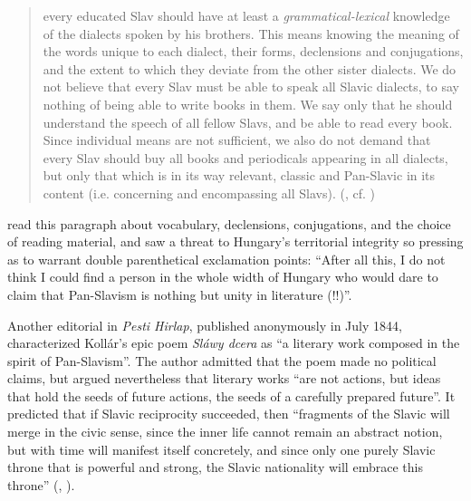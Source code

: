 \begin{quote}
    every educated Slav should have at least a \textit{grammatical-lexical} knowledge of the dialects spoken by his brothers. This means knowing the meaning of the words unique to each dialect, their forms, declensions and conjugations, and the extent to which they deviate from the other sister dialects. We do not believe that every Slav must be able to speak all Slavic dialects, to say nothing of being able to write books in them. We say only that he should understand the speech of all fellow Slavs, and be able to read every book. Since individual means are not sufficient, we also do not demand that every Slav should buy all books and periodicals appearing in all dialects, but only that which is in its way relevant, classic and Pan-Slavic in its content (i.e. concerning and encompassing all Slavs). (\cite[14]{kollar_uber_1837}, cf. \citeyear[78]{kollar_reciprocity_2009})
\end{quote}

\noindent \citet[704]{pulszky__1842} read this paragraph about vocabulary, declensions, conjugations, and the choice of reading material, and saw a threat to Hungary’s territorial integrity so pressing as to warrant double parenthetical exclamation points: “After all this, I do not think I could find a person in the whole width of Hungary who would dare to claim that Pan-Slavism is nothing but unity in literature (!!)”.

Another editorial in \textit{Pesti Hirlap}, published anonymously in July 1844, characterized Kollár’s epic poem \textit{Sláwy dcera} as “a literary work composed in the spirit of Pan-Slavism”. The author admitted that the poem made no political claims, but argued nevertheless that literary works “are not actions, but ideas that hold the seeds of future actions, the seeds of a carefully prepared future”. It predicted that if Slavic reciprocity succeeded, then “fragments of the Slavic will merge in the civic sense, since the inner life cannot remain an abstract notion, but with time will manifest itself concretely, and since only one purely Slavic throne that is powerful and strong, the Slavic nationality will embrace this throne” (, \cite[479]{anon_orszaggyules_1844}).


